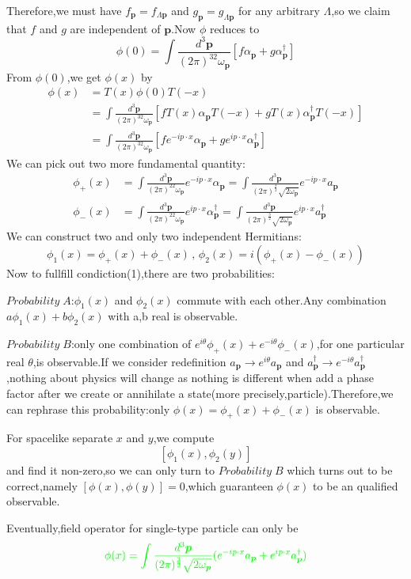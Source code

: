 \documentclass[a4paper]{article}
\begin{document}
Therefore,we must have $f_{\bm{p}}=f_{\Lambda\bm{p}}$ and $g_{\bm{p}}=g_{\Lambda\bm{p}}$ for any arbitrary $\Lambda$,so we claim that $f$ and $g$ are independent of $\bm{p}$.Now $\phi$ reduces to$$\phi(0)=\int\frac{d^3\bm{p}}{(2\pi)^32\omega_{\bm{p}}}[f\alpha_{\bm{p}}+g\alpha_{\bm{p}}^{\dagger}]$$From $\phi(0)$,we get $\phi(x)$ by
\begin{align*}
	\phi(x) &= T(x)\phi(0)T(-x)\\&=\int\frac{d^3\bm{p}}{(2\pi)^32\omega_{\bm{p}}}[fT(x)\alpha_{\bm{p}}T(-x)+gT(x)\alpha_{\bm{p}}^{\dagger}T(-x)]\\&=\int\frac{d^3\bm{p}}{(2\pi)^32\omega_{\bm{p}}}[fe^{-ip\cdot x}\alpha_{\bm{p}}+ge^{ip\cdot x}\alpha_{\bm{p}}^{\dagger}]
\end{align*}
We can pick out two more fundamental quantity:
\begin{align*}
	\phi_{+}(x)&=\int\frac{d^3\bm{p}}{(2\pi)^22\omega_{\bm{p}}}e^{-ip\cdot x}\alpha_{\bm{p}}=\int\frac{d^3\bm{p}}{(2\pi)^{\frac{3}{2}}\sqrt{2\omega_{\bm{p}}}}e^{-ip\cdot x}a_{\bm{p}}\\
	\phi_{-}(x)&=\int\frac{d^3\bm{p}}{(2\pi)^22\omega_{\bm{p}}}e^{ip\cdot x}\alpha_{\bm{p}}^{\dagger}=\int\frac{d^3\bm{p}}{(2\pi)^{\frac{3}{2}}\sqrt{2\omega_{\bm{p}}}}e^{ip\cdot x}a_{\bm{p}}^{\dagger}
\end{align*}
We can construct two and only two independent Hermitians:$$\phi_1(x)=\phi_{+}(x)+\phi_{-}(x)\, , \,\phi_2(x)=i(\phi_{+}(x)-\phi_{-}(x))$$
Now to fullfill condiction(1),there are two probabilities:
\par $Probability\;A$:$\phi_1(x)$ and $\phi_2(x)$ commute with each other.Any combination $a\phi_{1}(x)+b\phi_{2}(x)$ with a,b real is observable.
\par $Probability\;B$:only one combination of $e^{i\theta}\phi_+(x)+e^{-i\theta}\phi_{-}(x)$,for one particular real $\theta$,is observable.If we consider redefinition $a_{\bm{p}}\rightarrow e^{i\theta}a_{\bm{p}}$ and $a_{\bm{p}}^{\dagger}\rightarrow e^{-i\theta}a_{\bm{p}}^{\dagger}$,nothing about physics will change as nothing is different when add a phase factor after we create or annihilate a state(more precisely,particle).Therefore,we can rephrase this probability:only $\phi(x)=\phi_{+}(x)+\phi_{-}(x)$ is observable.
\par For spacelike separate $x$ and $y$,we compute $$[\phi_{1}(x),\phi_{2}(y)]$$and find it non-zero,so we can only turn to $Probability\; B$ which turns out to be correct,namely $[\phi(x),\phi(y)]=0$,which guaranteen $\phi(x)$ to be an qualified observable.
\par Eventually,field operator for single-type particle can only be$$\textcolor{green}{\phi(x)=\int\frac{d^3\bm{p}}{(2\pi)^{\frac{3}{2}}\sqrt{2\omega_{\bm{p}}}}(e^{-ip\cdot x}a_{\bm{p}}+e^{ip\cdot x}a_{\bm{p}}^{\dagger})}$$
\end{document}
